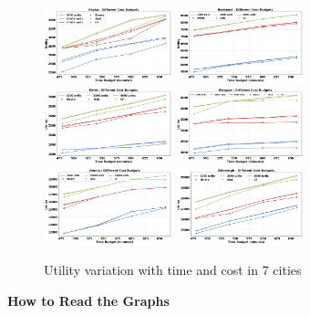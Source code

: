 \begin{figure}[htbp]
    \centering
    \includegraphics[width=0.33\textwidth]{plots/exp1-osaka_pkj.png}
    \includegraphics[width=0.33\textwidth]{plots/exp1-budapest_pkj.png}
    \includegraphics[width=0.33\textwidth]{plots/exp1-delhi_pkj.png}
    \includegraphics[width=0.33\textwidth]{plots/exp1-glasgow_pkj.png}
    \includegraphics[width=0.33\textwidth]{plots/exp1-vienna_pkj.png}
    \includegraphics[width=0.33\textwidth]{plots/exp1-edinburgh_pkj.png}
    \caption{Utility variation with time and cost in 7 cities}
    \label{fig:cities}
\end{figure}

\noindent \textbf{How to Read the Graphs}

